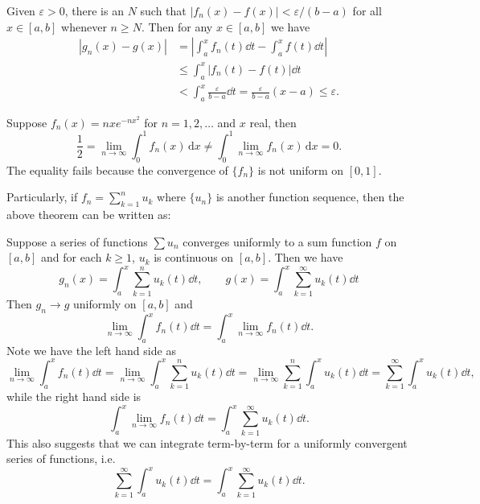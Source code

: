     \begin{proofenv}
        Given $\varepsilon >0$, there is an $N$ such that $|f_n(x) - f(x)| < \varepsilon/(b-a)$ for all $x\in [a,b]$ whenever $n\ge N$. Then for any $x\in [a,b]$ we have
        \[\begin{aligned}
            |g_n(x) - g(x)| &= \left| \int_a^x f_n(t) \dd t - \int_a^x f(t) \dd t \right|\\
            &\le \int_a^x |f_n(t) - f(t)| \dd t\\
            &< \int_a^x \frac{\varepsilon}{b-a} \dd t = \frac{\varepsilon}{b-a} (x-a) \le \varepsilon.
        \end{aligned}\]
    \end{proofenv}
    \begin{exampleenv}
        Suppose \(f_n(x)=nxe^{-nx^2}\) for \(n=1,2,\dots\) and \(x\) real, then
        $$
        \frac12 = \lim_{n\to\infty}\int_0^1 f_n(x)\,\mathrm{d}x
        \ne
        \int_0^1 \lim_{n\to\infty} f_n(x)\,\mathrm{d}x = 0.
        $$
        The equality fails because the convergence of $\{f_n\}$ is not uniform on $[0,1]$. 
    \end{exampleenv}
    \begin{propositionenv}
        Particularly, if $f_n=\displaystyle \sum_{k=1}^n u_k$ where $\{u_n\}$ is another function sequence, then the above theorem can be written as:

        Suppose a series of functions $\sum u_n$ converges uniformly to a sum function $f$ on $[a,b]$ and for each $k\ge 1$, $u_k$ is continuous on $[a,b]$. Then we have
        \[
        g_n(x) = \int_a^x \sum_{k=1}^n u_k(t) \dd t,\qquad g(x) = \int_a^x \sum_{k=1}^\infty u_k(t) \dd t
        \]
        Then $g_n \to g$ uniformly on $[a,b]$ and
        \[
        \lim_{n\to \infty} \int_a^x f_n(t) \dd t = \int_a^x \lim_{n\to \infty} f_n(t) \dd t.
        \]
        Note we have the left hand side as
        \[
        \lim_{n\to \infty} \int_a^x f_n(t) \dd t = \lim_{n\to \infty} \int_a^x \sum_{k=1}^n u_k(t) \dd t = \lim_{n\to \infty} \sum_{k=1}^n \int_a^x u_k(t) \dd t = \sum_{k=1}^\infty \int_a^x u_k(t) \dd t,
        \]
        while the right hand side is
        \[
        \int_a^x \lim_{n\to \infty} f_n(t) \dd t = \int_a^x \sum_{k=1}^\infty u_k(t) \dd t.
        \]
        This also suggests that we can integrate term-by-term for a uniformly convergent series of functions, i.e.
        \[
        \sum_{k=1}^\infty \int_a^x u_k(t) \dd t = \int _a^x\sum_{k=1}^\infty u_k(t) \dd t.
        \]

    \end{propositionenv}
